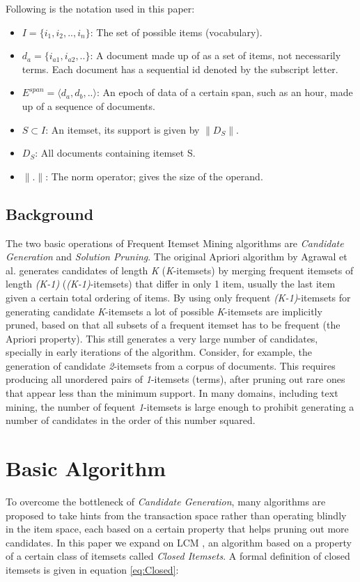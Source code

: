 \documentclass{sig-alternate}
\begin{document}
Following is the notation used in this paper:

\begin{itemize}
\item $I = \{i_1,i_2,..,i_n\}$: The set of possible items (vocabulary).
\item $d_a = \{i_{a1},i_{a2},..\}$: A document made up of as a set of items, not necessarily terms. Each document has a sequential id denoted by the subscript letter.
\item $E^{span} = \langle d_a, d_b, ..\rangle$: An epoch of data of a certain span, such as an hour, made up of a sequence of documents.
\item $S \subset I$: An itemset, its support is given by $\|D_S\|$.
\item $D_S$: All documents containing itemset S.
\item $\|.\|$: The norm operator; gives the size of the operand.

\end{itemize}

\subsection{Background}

The two basic operations of Frequent Itemset Mining algorithms are \emph{Candidate Generation} and \emph{Solution Pruning}. The original Apriori algorithm by Agrawal et al. \cite{apriori} generates candidates of length \emph{K} (\emph{K}-itemsets) by merging frequent itemsets of length \emph{(K-1)} (\emph{(K-1)}-itemsets) that differ in only 1 item, usually the last item given a certain total ordering of items. By using only frequent  \emph{(K-1)}-itemsets for generating candidate \emph{K}-itemsets a lot of possible \emph{K}-itemsets are implicitly pruned, based on that all subsets of a frequent itemset has to be frequent (the Apriori property). This still generates a very large number of candidates, specially in early iterations of the algorithm. Consider, for example, the generation of candidate \emph{2}-itemsets from a corpus of documents. This requires producing all unordered pairs of \emph{1}-itemsets (terms), after pruning out rare ones that appear less than the minimum support. In many domains, including text mining, the number of fequent \emph{1}-itemsets is large enough to prohibit generating a number of candidates in the order of this number squared. 

\section{Basic Algorithm}
To overcome the bottleneck of \emph{Candidate Generation}, many algorithms are proposed to take hints from the transaction space rather than operating blindly in the item space, each based on a certain property that helps pruning out more candidates. In this paper we expand on LCM \cite{lcm}, an algorithm based on a property of a certain class of itemsets called \emph{Closed Itemsets}. A formal definition of closed itemsets is given in equation \ref{eq:Closed}: 
\end{document}
